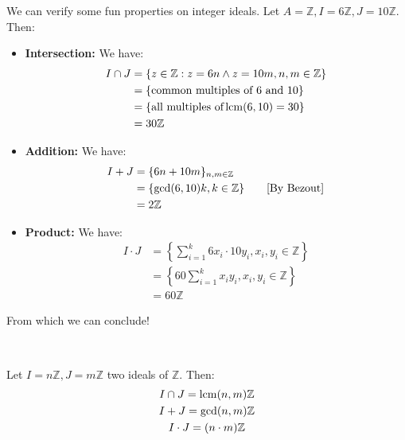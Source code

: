 We can verify some fun properties on integer ideals. Let $A = \mathbb{Z}, I = 6\mathbb{Z}, J = 10\mathbb{Z}$. Then: 
\begin{itemize}
  \item \textbf{Intersection:} We have: 
  \begin{align*}
    I \cap J 
    &= \{z \in \mathbb{Z}: z = 6n \land z = 10m, n, m \in \mathbb{Z}\} \\
    &= \{\text{common multiples of 6 and 10}\} \\
    &= \{\text{all multiples of} \operatorname{lcm}(6, 10) = 30\} \\
    &= 30\mathbb{Z}
  \end{align*}
  \item \textbf{Addition:} We have: 
  \begin{align*}
    I + J 
    &= \{6n + 10m\}_{n, m \in \mathbb{Z}} \\
    &= \{\gcd(6, 10)k, k \in \mathbb{Z}\} \tag*{\text{[By Bezout]}} \\
    &= 2\mathbb{Z}
  \end{align*}
  \item \textbf{Product:} We have: 
  \begin{align*}
    I \cdot J 
    &= \left\{\sum_{i = 1}^k 6x_i \cdot 10y_i, x_i, y_i \in \mathbb{Z}\right\} \\
    &= \left\{ 60\sum_{i = 1}^k x_iy_i,  x_i, y_i \in \mathbb{Z} \right\} \\
    &= 60\mathbb{Z}
  \end{align*}
\end{itemize}

From which we can conclude!

\ 

\begin{unnumthm}
  Let $I = n\mathbb{Z}, J = m\mathbb{Z}$ two ideals of $\mathbb{Z}$. Then: 
  \begin{gather*}
    I \cap J = \operatorname{lcm}(n, m)\mathbb{Z} \\
    I + J = \gcd(n, m)\mathbb{Z} \\
    I \cdot J = (n \cdot m)\mathbb{Z}
  \end{gather*}
\end{unnumthm}

